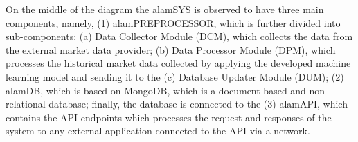 On the middle of the diagram the alamSYS is observed to have three main components, 
namely, (1) alamPREPROCESSOR, which is further divided into sub-components: 
(a) Data Collector Module (DCM), which collects the data from the external market data provider; 
(b) Data Processor Module (DPM), which processes the historical market data collected by 
applying the developed machine learning model and sending it to the (c) Database Updater
Module (DUM); (2) alamDB, which is based on MongoDB, which is a document-based and non-relational 
database; finally, the database is connected to the (3) alamAPI, which contains the 
API endpoints which processes the request and responses of the system to any external 
application connected to the API via a network.